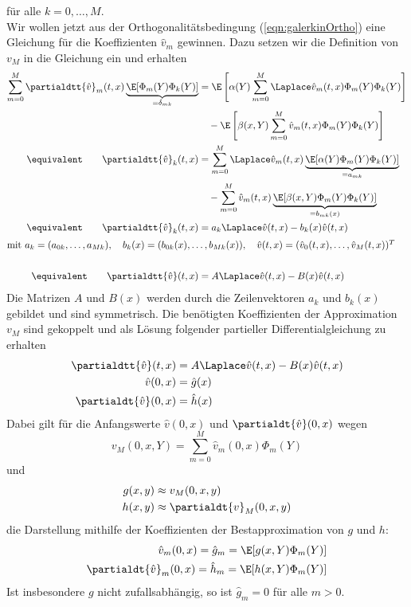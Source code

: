 für alle $k=0,\dots,M$.\\
Wir wollen jetzt aus der Orthogonalitätsbedingung (\ref{eqn:galerkinOrtho}) eine Gleichung für die Koeffizienten $\hat{v}_m$ gewinnen. Dazu setzen wir die Definition von $v_M$ in die Gleichung ein und erhalten
\begin{align}
\sum_{m=0}^M\partialdtt{\hat{v}}_m(t,x)\underbrace{\E[\Phi_m(Y)\Phi_k(Y)]}_{=\delta_{mk}}&=\E\left[\alpha(Y)\sum_{m=0}^M\Laplace \hat{v}_m(t,x)\Phi_m(Y)\Phi_k(Y)\right]\nonumber\\
&\quad -\E\left[\beta(x,Y)\sum_{m=0}^M\hat{v}_m(t,x)\Phi_m(Y)\Phi_k(Y)\right]\nonumber\\
\equivalent \qquad \partialdtt{\hat{v}}_k(t,x)&=\sum_{m=0}^M\Laplace \hat{v}_m(t,x)\underbrace{\E[\alpha(Y)\Phi_m(Y)\Phi_k(Y)]}_{=a_{mk}}\nonumber\\
&\quad -\sum_{m=0}^M\hat{v}_m(t,x)\underbrace{\E[\beta(x,Y)\Phi_m(Y)\Phi_k(Y)]}_{=b_{mk}(x)}\nonumber\\
\equivalent \qquad \partialdtt{\hat{v}}_k(t,x)&=a_k\Laplace \hat{v}(t,x)-b_k(x)\hat{v}(t,x)\label{eqn:galerkin_def_medium}\\
\intertext{mit $ a_k=(a_{0k},\dots,a_{Mk}),\quad b_k(x)=(b_{0k}(x),\dots,b_{Mk}(x)),\quad \hat{v}(t,x)=(\hat{v}_0(t,x),\dots,\hat{v}_M(t,x))^T$}\nonumber\\
\equivalent \qquad \partialdtt{\hat{v}}(t,x)&=A\Laplace \hat{v}(t,x)-B(x)\hat{v}(t,x)\nonumber
\end{align}
Die Matrizen $A$ und $B(x)$ werden durch die Zeilenvektoren $a_k$ und $b_k(x)$ gebildet und sind symmetrisch. Die benötigten Koeffizienten der Approximation $v_M$ sind gekoppelt und als Lösung folgender partieller Differentialgleichung zu erhalten
\begin{equation}
\label{eqn:galerkin_dgl}
\begin{split}
\partialdtt{\hat{v}}(t,x)&=A\Laplace \hat{v}(t,x)-B(x)\hat{v}(t,x)\\
\hat{v}(0,x)&=\hat{g}(x)\\
\partialdt{\hat{v}}(0,x)&=\hat{h}(x)\\
\end{split}
\end{equation}
Dabei gilt für die Anfangswerte $\hat{v}(0,x)$ und $\partialdt{\hat{v}}(0,x)$ wegen 
\[v_M(0,x,Y)=\sum_{m=0}^M\hat{v}_m(0,x)\Phi_m(Y)\]
und
\begin{align*}
g(x,y)&\approx v_M(0,x,y)\\
h(x,y)&\approx \partialdt{v}_M(0,x,y)
\end{align*}
die Darstellung mithilfe der Koeffizienten der Bestapproximation von $g$ und $h$:
\begin{align*}
\hat{v}_m(0,x)=\hat{g}_m=\E[g(x,Y)\Phi_m(Y)]\\
\partialdt{\hat{v}}_m(0,x)=\hat{h}_m=\E[h(x,Y)\Phi_m(Y)]
\end{align*}
Ist insbesondere $g$ nicht zufallsabhängig, so ist $\hat{g}_m=0$ für alle $m>0$.
